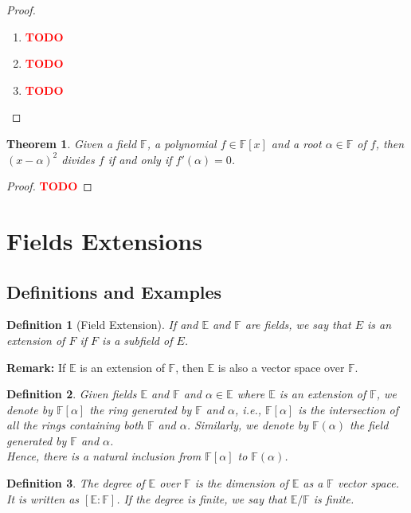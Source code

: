 \documentclass{article}
\newtheorem*{theorem}{Theorem}
\newtheorem*{definition}{Definition}
\newcommand{\F}{\mathbb{F}}
\newcommand{\E}{\mathbb{E}}
\newcommand{\td}{\textcolor{red}{\textbf{TODO}}}
\newenvironment{remark}{\noindent\textbf{Remark:}}{}
\begin{document}
\begin{proof}
    \begin{enumerate}
        \item \td 
        \item \td 
        \item \td
    \end{enumerate}
\end{proof}

\begin{theorem}
    Given a field $\F$, a polynomial $f \in \F[x]$ and a root $\alpha \in \F$ of $f$, then $(x - \alpha)^2$ divides $f$ if and only if $f'(\alpha) = 0$.
\end{theorem}

\begin{proof}
    \td 
\end{proof}

\section{Fields Extensions}

\subsection{Definitions and Examples}

\begin{definition}[Field Extension]
    If and $\E$ and $\F$ are fields, we say that $E$ is an extension of $F$ if $F$ is a subfield of $E$.
\end{definition}

\begin{remark}
    If $\E$ is an extension of $\F$, then $\E$ is also a vector space over $\F$.
\end{remark}

\begin{definition}
    Given fields $\E$ and $\F$ and $\alpha \in \E$ where $\E$ is an extension of $\F$, we denote by $\F[\alpha]$ the ring generated by $\F$ and $\alpha$, i.e., $\F[\alpha]$ is the intersection of all the rings containing both $\F$ and $\alpha$. Similarly, we denote by $\F(\alpha)$ the field generated by $\F$ and $\alpha$.\\
    Hence, there is a natural inclusion from $\F[\alpha]$ to $\F(\alpha)$.
\end{definition}

\begin{definition}
    The degree of $\E$ over $\F$ is the dimension of $\E$ as a $\F$ vector space. It is written as $[\E:\F]$. If the degree is finite, we say that $\E/\F$ is finite. 
\end{definition}
\end{document}
